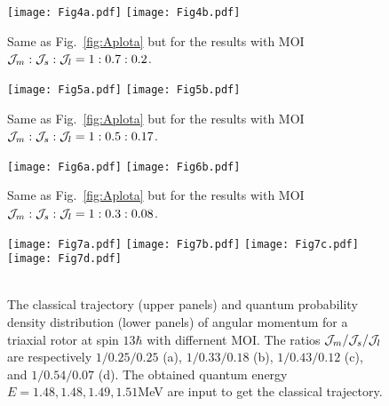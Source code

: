 \documentclass[aps,prc,preprint,showpacs,groupedaddress,floatfix,amsmath,amssymb]{revtex4-1}
\begin{document}
\begin{figure}[ht!]
  \centering
\texttt{[image: Fig4a.pdf]}
\texttt{[image: Fig4b.pdf]}
\caption{\label{fig:Aplotb}
Same as Fig.~\ref{fig:Aplota} but for the results with MOI ${\cal J}_m:{\cal J}_s:{\cal J}_l=1:0.7:0.2$.
}
\end{figure}

\begin{figure}[ht!]
  \centering
\texttt{[image: Fig5a.pdf]}
\texttt{[image: Fig5b.pdf]}
\caption{\label{fig:Aplotc}
Same as Fig.~\ref{fig:Aplota} but for the results with MOI ${\cal J}_m:{\cal J}_s:{\cal J}_l=1:0.5:0.17$.
}
\end{figure}

\begin{figure}[ht!]
\centering
\texttt{[image: Fig6a.pdf]}
\texttt{[image: Fig6b.pdf]}
\caption{\label{fig:Aplotd}
Same as Fig.~\ref{fig:Aplota} but for the results with  MOI ${\cal J}_m:{\cal J}_s:{\cal J}_l=1:0.3:0.08$.
}
\end{figure}


\begin{figure}[ht!]
\centering
{\texttt{[image: Fig7a.pdf]}}
{\texttt{[image: Fig7b.pdf]}}
{\texttt{[image: Fig7c.pdf]}}
{\texttt{[image: Fig7d.pdf]}}\\
\\
\caption{\label{fig:trajectory} The classical trajectory (upper panels) and quantum probability density distribution (lower panels) of angular momentum for a triaxial rotor at spin $13\hbar$  with differnent MOI.  The ratios ${\cal J}_{m}/{\cal J}_{s}/{\cal J}_{l}$ are respectively $1/0.25/0.25$ (a), $1/0.33/0.18$ (b), $1/0.43/0.12$ (c), and $1/0.54/0.07$ (d). The obtained quantum energy $E=1.48, 1.48, 1.49, 1.51$MeV are  input to get the classical trajectory. }
\end{figure}

\end{document}
